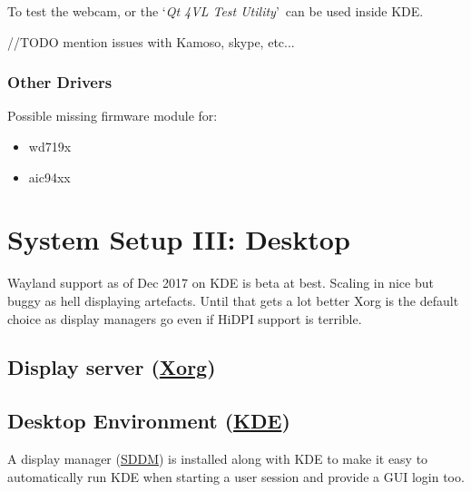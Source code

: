 To test the webcam,  or the \lq \textit{Qt 4VL Test Utility}\rq\ can be used inside KDE.

//TODO mention issues with Kamoso, skype, etc...

\subsubsection{Other Drivers}

Possible missing firmware module for:
\begin{itemize}[noitemsep,topsep=0pt,leftmargin=*]
	\item wd719x
	\item aic94xx
\end{itemize}


\section{System Setup III: Desktop}

Wayland support as of Dec 2017 on KDE is beta at best. Scaling in nice but buggy as hell displaying artefacts. Until that gets a lot better Xorg is the default choice as display managers go even if HiDPI support is terrible. 

\subsection{Display server (\href{https://wiki.archlinux.org/index.php/xorg}{Xorg})}


\subsection{Desktop Environment (\href{https://wiki.archlinux.org/index.php/KDE}{KDE})}

A display manager (\href{https://wiki.archlinux.org/index.php/SDDM}{SDDM}) is installed along with KDE to make it easy to automatically run KDE when starting a user session and provide a GUI login too.


